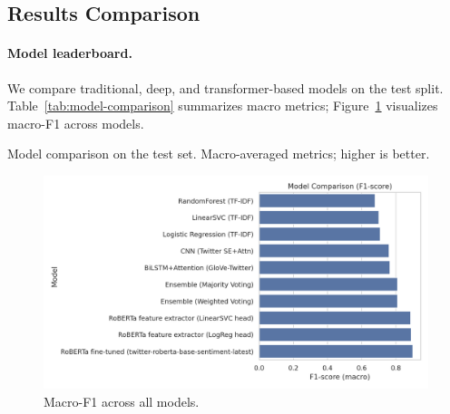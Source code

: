 \documentclass[10pt]{article}
\begin{document}
\subsection{Results Comparison}
\paragraph{Model leaderboard.}
We compare traditional, deep, and transformer-based models on the test split. Table~\ref{tab:model-comparison} summarizes macro metrics; Figure~\ref{fig:model-f1-comparison} visualizes macro-F1 across models.

\begin{table}[H]
  \centering
  \caption{Model comparison on the test set. Macro-averaged metrics; higher is better.}
  \label{tab:model-comparison}
  
\end{table}

\begin{figure}[H]
  \centering
  \includegraphics[width=.82\linewidth]{../SCRITPS/artifacts/figures/model_f1_comparison.png}
  \caption{Macro-F1 across all models.}
  \label{fig:model-f1-comparison}
\end{figure}
\end{document}
